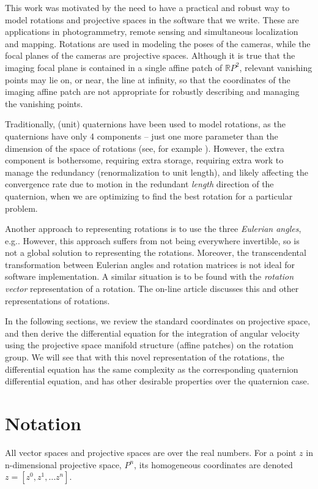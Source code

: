 \documentclass{gen-j-l}
\theoremstyle{definition}
\theoremstyle{remark}
\numberwithin{equation}{section}
\providecommand{\R}{{\mathbb R}}
\begin{document}
This work was motivated by the need to have a practical and robust way to
model rotations and projective spaces in the software that we write. These
are applications in photogrammetry, remote sensing and simultaneous
localization and mapping.  Rotations are used in modeling the poses of the
cameras, while the focal planes of the cameras are projective spaces.  
Although it is true that the imaging focal plane is contained in a single 
affine patch 
of ${\R}P^2$, relevant vanishing points may lie on, or near, the line at 
infinity, so that the coordinates of the imaging affine patch are not 
appropriate for robustly describing and managing the vanishing points.

Traditionally, (unit) quaternions have been used to model rotations,
as the quaternions have only 4 components -- just one more parameter
than the dimension of the space of rotations (see, for example
\cite{schultz06, rogers03}).  However, the extra component is
bothersome, requiring extra storage, requiring extra work to manage
the redundancy (renormalization to unit length), and likely affecting
the convergence rate due to motion in the redundant {\em length}
direction of the quaternion, when we are optimizing to find the best
rotation for a particular problem.

Another approach to representing
rotations is to use the three {\em Eulerian angles}, e.g.\cite{goldst50}.
However, this approach suffers from not being everywhere invertible, so
is not a global solution to representing the rotations.  Moreover, the
transcendental transformation between Eulerian angles and rotation 
matrices is not ideal for software implementation.  A similar situation
is to be found with the {\em rotation vector} representation of a rotation.
The on-line article \cite{wiki-rot} discusses this and other representations
of rotations.

In the following sections, we review the standard coordinates on
projective space, and then derive the differential equation for the
integration of angular velocity using the projective space manifold
structure (affine patches) on the rotation group.  
We will see that with this novel representation of the rotations,
the differential equation has the same
complexity as the corresponding quaternion differential equation, and
has other desirable properties over the quaternion case.

\section{Notation}
All vector spaces and projective spaces are over the real numbers.
For a point $z$ in n-dimensional projective space, $P^n$, its homogeneous
coordinates are denoted $z = [z^0, z^1, \ldots z^n]$.
\end{document}
